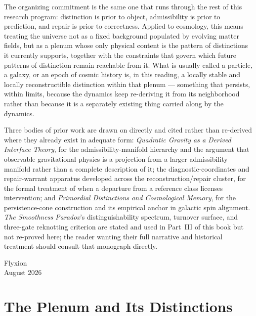 \documentclass[12pt,a4paper,twoside,openright]{book}
\theoremstyle{plain}
\theoremstyle{definition}
\theoremstyle{remark}
\begin{document}
The organizing commitment is the same one that runs through the rest of this research program: distinction is prior to object, admissibility is prior to prediction, and repair is prior to correctness. Applied to cosmology, this means treating the universe not as a fixed background populated by evolving matter fields, but as a plenum whose only physical content is the pattern of distinctions it currently supports, together with the constraints that govern which future patterns of distinction remain reachable from it. What is usually called a particle, a galaxy, or an epoch of cosmic history is, in this reading, a locally stable and locally reconstructible distinction within that plenum --- something that persists, within limits, because the dynamics keep re-deriving it from its neighborhood rather than because it is a separately existing thing carried along by the dynamics.

Three bodies of prior work are drawn on directly and cited rather than re-derived where they already exist in adequate form: \emph{Quadratic Gravity as a Derived Interface Theory}, for the admissibility-manifold hierarchy and the argument that observable gravitational physics is a projection from a larger admissibility manifold rather than a complete description of it; the diagnostic-coordinates and repair-warrant apparatus developed across the reconstruction/repair cluster, for the formal treatment of when a departure from a reference class licenses intervention; and \emph{Primordial Distinctions and Cosmological Memory}, for the persistence-cone construction and its empirical anchor in galactic spin alignment. \emph{The Smoothness Paradox}'s distinguishability spectrum, turnover surface, and three-gate reknotting criterion are stated and used in Part~III of this book but not re-proved here; the reader wanting their full narrative and historical treatment should consult that monograph directly.

\vspace{12pt}
\noindent
Flyxion\\
August 2026

\clearpage

\mainmatter

\part{The Plenum and Its Distinctions}
\end{document}
